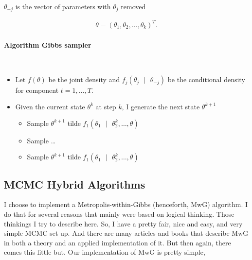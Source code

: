 \documentclass[a4paper,11pt,english]{article}
\begin{document}
			$\theta_{-j}$ is the vector of parameters with $\theta_j$ removed
	
			\begin{eqnarray*}
				\theta = (\theta_1, \theta_2,\ldots,\theta_k)^T.
			\end{eqnarray*}	 
	
			\paragraph{Algorithm Gibbs sampler} \text{ } \\
				\begin{itemize}
					\item 	Let $f(\theta)$ be the joint density and $f_j(\theta_j \text{ } | \text{ } \theta_{-j})$ be the conditional density for 
					component $t=1,\ldots, T$.
					\item Given the current state $\theta^k$ at step $k$, I generate the next state $\theta^{k+1}$		
					
					\begin{itemize}
						\item Sample $\theta^{k+1}$ tilde $f_1(\theta_1 \text{ } | \text{ } \theta_2^k,\ldots,\theta)$
						\item Sample \ldots
						\item Sample $\theta^{k+1}$ tilde $f_1(\theta_1 \text{ } | \text{ } \theta_2^k,\ldots,\theta)$
					\end{itemize}
				\end{itemize}


	





		\subsection{MCMC Hybrid Algorithms}
		
		I choose to implement a Metropolis-within-Gibbs (henceforth, MwG) algorithm. I do that for several reasons that mainly were based on logical 
		thinking. Those thinkings I try to describe here. So, I have a pretty fair, nice and easy, and very simple MCMC set-up. And there are many 
		articles and books that describe MwG in both a theory and an applied implementation of it. But then again, there comes this little but. Our 
		implementation of MwG is pretty simple,  
				
\end{document}
